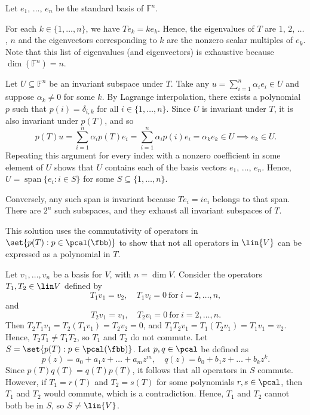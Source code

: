 \begin{csp}
    Let $e_1$, $\dots$, $e_n$ be the standard basis of $\mathbb{F}^n$.
    \begin{subexercises}
        \item For each $k \in \{1, \dots, n\}$, we have $Te_k=ke_k$.
		Hence, the eigenvalues of $T$ are $1$, $2$, $\dots$, $n$ and the eigenvectors corresponding to $k$ are the nonzero scalar multiples of $e_k$.
		Note that this list of eigenvalues (and eigenvectors) is exhaustive because $\dim \left(\mathbb{F}^n \right)=n$.
        \item Let $U \subseteq \mathbb{F}^n$ be an invariant subspace under $T$.
		Take any $u=\sum^{n}_{i=1} \alpha_i e_i \in U$ and suppose $\alpha_k \neq 0$ for some $k$.
		By Lagrange interpolation, there exists a polynomial $p$ such that $p(i)=\delta_{i,k}$ for all $i \in \{1, \dots, n\}$.
		Since $U$ is invariant under $T$, it is also invariant under $p(T)$, and so
        \[
        	p(T)u=\sum^{n}_{i=1} \alpha_i p(T) e_i=\sum^{n}_{i=1} \alpha_i p(i) e_i=\alpha_k e_k \in U \implies e_k \in U.
        \]
        Repeating this argument for every index with a nonzero coefficient in some element of $U$ shows that $U$ contains each of the basis vectors $e_1$, $\dots$, $e_n$.
		Hence, $U=\operatorname{span} \{e_i: i \in S\}$ for some $S \subseteq \{1, \dots, n\}$.

        Conversely, any such span is invariant because $Te_i=ie_i$ belongs to that span.
		There are $2^n$ such subspaces, and they exhaust all invariant subspaces of $T$. \qedhere
    \end{subexercises}
\end{csp}


This solution uses the commutativity of operators in $\set{p(T) : p \in \pcal(\fbb)}$ to show that not all operators in $\lin{V}$ can be expressed as a polynomial in $T$.

\begin{me}
	Let $v_1, \ldots, v_n$ be a basis for $V$, with $n = \dim V$.
	Consider the operators $T_1, T_2 \in \lin V$ defined by
    \[
    	T_1v_1 = v_2, \quad T_1v_i = 0~\text{for}~i = 2, \ldots, n,
    \]
    and
    \[
    	T_2v_1 = v_1, \quad T_2v_i = 0~\text{for}~i = 2, \ldots, n.
    \]
    Then $T_2T_1v_1 = T_2(T_1v_1) = T_2v_2 = 0$, and $T_1T_2v_1 = T_1(T_2v_1) = T_1v_1 = v_2$.
	Hence, $T_2T_1 \neq T_1T_2$, so $T_1$ and $T_2$ do not commute.
	Let $S = \set{p(T) : p \in \pcal(\fbb)}$. Let $p, q \in \pcal$ be defined as
    \[
    	p(z) = a_0 + a_1 z + \dots + a_m z^m, \quad q(z) = b_0 + b_1 z + \dots + b_k z^k.
    \]
    Since $p(T)q(T) = q(T)p(T)$, it follows that all operators in $S$ commute.
    However, if $T_1 = r(T)$ and $T_2 = s(T)$ for some polynomials $r, s \in \pcal$, then $T_1$ and $T_2$ would commute, which is a contradiction.
    Hence, $T_1$ and $T_2$ cannot both be in $S$, so $S \neq \lin{V}$.
\end{me}

